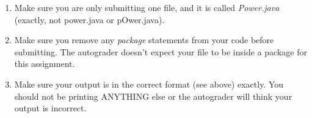\documentclass[paper=a4, fontsize=11pt, parskip=full]{scrartcl} %
\numberwithin{equation}{section} %
\numberwithin{figure}{section} %
\numberwithin{table}{section} %
\begin{document}
\begin{enumerate}
	\item Make sure you are only submitting one file, and it is called \emph{Power.java} (exactly, not power.java or pOwer.java).
	\item Make sure you remove any \emph{package} statements from your code before submitting. The autograder doesn't expect your file to be inside a package for this assignment.
	\item Make sure your output is in the correct format (see above) exactly. You should not be printing ANYTHING else or the autograder will think your output is incorrect.
\end{enumerate}




\end{document}
